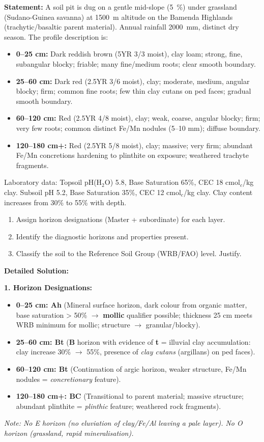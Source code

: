 \documentclass[11pt]{article}
\begin{document}
\begin{exoresolu}
\textbf{Statement:} A soil pit is dug on a gentle mid-slope (\SI{5}{\%}) under grassland (Sudano-Guinea savanna) at \SI{1500}{m} altitude on the Bamenda Highlands (trachytic/basaltic parent material). Annual rainfall \SI{2000}{mm}, distinct dry season. The profile description is:
\begin{itemize}
\item \textbf{0--25 cm:} Dark reddish brown (5YR 3/3 moist), clay loam; strong, fine, subangular blocky; friable; many fine/medium roots; clear smooth boundary.
\item \textbf{25--60 cm:} Dark red (2.5YR 3/6 moist), clay; moderate, medium, angular blocky; firm; common fine roots; few thin clay cutans on ped faces; gradual smooth boundary.
\item \textbf{60--120 cm:} Red (2.5YR 4/8 moist), clay; weak, coarse, angular blocky; firm; very few roots; common distinct Fe/Mn nodules (5--10 mm); diffuse boundary.
\item \textbf{120--180 cm+:} Red (2.5YR 5/8 moist), clay; massive; very firm; abundant Fe/Mn concretions hardening to plinthite on exposure; weathered trachyte fragments.
\end{itemize}
Laboratory data: Topsoil pH(H$_2$O) 5.8, Base Saturation 65\%, CEC 18 cmol$_c$/kg clay. Subsoil pH 5.2, Base Saturation 35\%, CEC 12 cmol$_c$/kg clay. Clay content increases from 30\% to 55\% with depth.
\begin{enumerate}
\item Assign horizon designations (Master + subordinate) for each layer.
\item Identify the diagnostic horizons and properties present.
\item Classify the soil to the Reference Soil Group (WRB/FAO) level. Justify.
\end{enumerate}

\tcblower
\textbf{Detailed Solution:}

\noindent\textbf{1. Horizon Designations:}
\begin{itemize}
\item \textbf{0--25 cm: Ah} (Mineral surface horizon, dark colour from organic matter, base saturation > 50\% $\rightarrow$ \textbf{mollic} qualifier possible; thickness 25 cm meets WRB minimum for mollic; structure $\rightarrow$ granular/blocky).
\item \textbf{25--60 cm: Bt} (\textbf{B} horizon with evidence of \textbf{t} = illuvial clay accumulation: clay increase 30\% $\rightarrow$ 55\%, presence of \emph{clay cutans} (argillans) on ped faces).
\item \textbf{60--120 cm: Bt} (Continuation of argic horizon, weaker structure, Fe/Mn nodules = \emph{concretionary} feature).
\item \textbf{120--180 cm+: BC} (Transitional to parent material; massive structure; abundant plinthite = \emph{plinthic} feature; weathered rock fragments).
\end{itemize}
\textit{Note: No E horizon (no eluviation of clay/Fe/Al leaving a pale layer). No O horizon (grassland, rapid mineralisation).}


\end{exoresolu}
\end{document}
